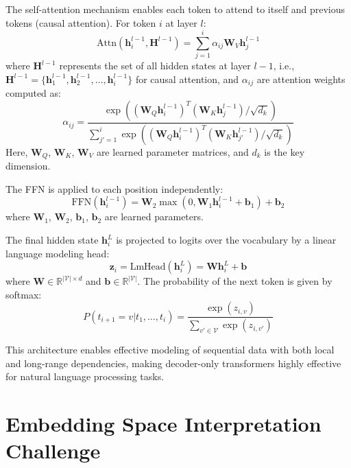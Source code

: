 The self-attention mechanism enables each token to attend to itself and previous tokens (causal attention). For token $i$ at layer $l$:
\begin{equation}
    \text{Attn}(\mathbf{h}_i^{l-1}, \mathbf{H}^{l-1}) = \sum_{j=1}^{i} \alpha_{ij} \mathbf{W}_V \mathbf{h}_j^{l-1}
\end{equation}
where $\mathbf{H}^{l-1}$ represents the set of all hidden states at layer $l-1$, i.e., $\mathbf{H}^{l-1} = \{\mathbf{h}_1^{l-1}, \mathbf{h}_2^{l-1}, \ldots, \mathbf{h}_i^{l-1}\}$ for causal attention, and $\alpha_{ij}$ are attention weights computed as:
\begin{equation}
    \alpha_{ij} = \frac{\exp((\mathbf{W}_Q \mathbf{h}_i^{l-1})^T (\mathbf{W}_K \mathbf{h}_j^{l-1}) / \sqrt{d_k})}{\sum_{j'=1}^{i} \exp((\mathbf{W}_Q \mathbf{h}_i^{l-1})^T (\mathbf{W}_K \mathbf{h}_{j'}^{l-1}) / \sqrt{d_k})}
\end{equation}
Here, $\mathbf{W}_Q$, $\mathbf{W}_K$, $\mathbf{W}_V$ are learned parameter matrices, and $d_k$ is the key dimension.

The FFN is applied to each position independently:
\begin{equation}
    \text{FFN}(\mathbf{h}_i^{l-1}) = \mathbf{W}_2 \max(0, \mathbf{W}_1 \mathbf{h}_i^{l-1} + \mathbf{b}_1) + \mathbf{b}_2
\end{equation}
where $\mathbf{W}_1$, $\mathbf{W}_2$, $\mathbf{b}_1$, $\mathbf{b}_2$ are learned parameters.

The final hidden state $\mathbf{h}_i^L$ is projected to logits over the vocabulary by a linear language modeling head:
\begin{equation}
    \mathbf{z}_i = \text{LmHead}(\mathbf{h}_i^L) = \mathbf{W} \mathbf{h}_i^L + \mathbf{b}
    \label{eq::lm_head}
\end{equation}
where $\mathbf{W} \in \mathbb{R}^{|\mathcal{V}| \times d}$ and $\mathbf{b} \in \mathbb{R}^{|\mathcal{V}|}$. The probability of the next token is given by softmax:
\begin{equation}
    P(t_{i+1} = v | t_1, \ldots, t_i) = \frac{\exp(z_{i,v})}{\sum_{v' \in \mathcal{V}} \exp(z_{i,v'})}
    \label{eq::softmax}
\end{equation}

This architecture enables effective modeling of sequential data with both local and long-range dependencies, making decoder-only transformers highly effective for natural language processing tasks.


\section{Embedding Space Interpretation Challenge}

